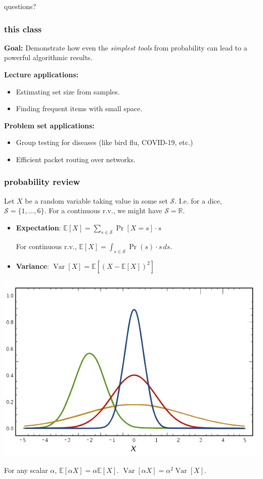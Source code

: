 \documentclass[]{beamer}
\newcommand{\R}{\mathbb{R}}
\newcommand{\E}{\mathbb{E}}
\DeclareMathOperator{\Var}{Var}
\begin{document}
	\begin{frame}[standout]
		\begin{center}
			questions?
		\end{center}
	\end{frame}
	
	\begin{frame}
		\frametitle{this class}
		\textbf{Goal:} Demonstrate how even the \emph{simplest tools} from probability can lead to a powerful algorithmic results. 
		
		\textbf{Lecture applications:}
		\begin{itemize}
			\item Estimating set size from samples. 
			\item Finding frequent items with small space.
		\end{itemize}
		\textbf{Problem set applications:}
		\begin{itemize}
			\item Group testing for diseases (like bird flu, COVID-19, etc.)
			\item Efficient packet routing over networks. 
		\end{itemize}	
	\end{frame}
	
	\begin{frame}
		\frametitle{probability review}
		Let ${X}$ be a random variable taking value in some set $\mathcal{S}$. I.e. for a dice, $\mathcal{S} = \{1,\ldots, 6\}$. For a continuous r.v., we might have $\mathcal{S} = \R$.
		
		\begin{itemize}
			\item \textbf{Expectation}: \hspace{1em}$\E[X] = \sum_{s\in \mathcal{S}} \Pr[{X} = s]\cdot s$
			
			\vspace{.5em}
			For continuous r.v., $\E[X] = \int_{s\in \mathcal{S}} \Pr(s)\cdot s \,ds$.
			
			\vspace{1em}
			\item \textbf{Variance}: \hspace{1.2em} $\Var[X] = \E[(X - \E[X])^2]$
		\end{itemize}
		\begin{center}
			\includegraphics[width=.45\textwidth]{rvs.png}
			
			For any scalar $\alpha$,  $\E[\alpha X] = \alpha \E[X]$. $\Var[\alpha X] = \alpha^2 \Var[X]$.
		\end{center} 
	\end{frame}
	
\end{document}
